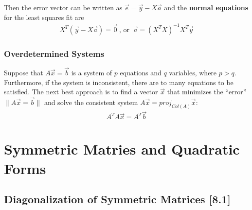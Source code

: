 \documentclass[a4paper,9pt]{extarticle}
\begin{document}
\begin{multicols*}{2}
Then the error vector can be written as $\vec{e} = \vec{y} - X\vec{a}$ and the \textbf{normal equations} for the least squares fit are
\begin{equation} \label{7.3-4}
    \begin{split}
        X^T (\vec{y} - X\vec{a}) = \vec{0} \> \textrm{, or } \> \vec{a} = (X^T X)^{-1} X^T \vec{y}
    \end{split}
\end{equation}


\subsubsection{Overdetermined Systems}
Suppose that $A \vec{x} = \vec{b}$ is a system of $p$ equations and $q$ variables, where $p > q$. Furthermore, if the system is inconsistent, there are to many equations to be satisfied. The next best approach is to find a vector $\vec{x}$ that minimizes the ``error'' $\|A \vec{x} = \vec{b}\|$ and solve the consistent system $A \vec{x} = proj_{Col(A)} \vec{x}$:
\begin{equation} \label{7.3-5}
    \begin{split}
        A^T A \vec{x} = A^T \vec{b}
    \end{split}
\end{equation}


\section{Symmetric Matries and Quadratic Forms}


\subsection{Diagonalization of Symmetric Matrices [8.1]}



\end{multicols*}
\end{document}
